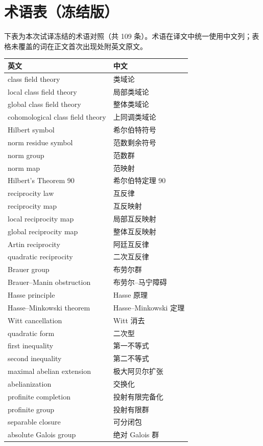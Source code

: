 \section*{术语表（冻结版）}
下表为本次试译冻结的术语对照（共 109 条）。术语在译文中统一使用中文列；表格未覆盖的词在正文首次出现处附英文原文。
\begin{longtable}{p{}p{}}
\toprule 英文 & 中文 \\ \midrule \endhead
class field theory & 类域论 \\
local class field theory & 局部类域论 \\
global class field theory & 整体类域论 \\
cohomological class field theory & 上同调类域论 \\
Hilbert symbol & 希尔伯特符号 \\
norm residue symbol & 范数剩余符号 \\
norm group & 范数群 \\
norm map & 范映射 \\
Hilbert's Theorem 90 & 希尔伯特定理 90 \\
reciprocity law & 互反律 \\
reciprocity map & 互反映射 \\
local reciprocity map & 局部互反映射 \\
global reciprocity map & 整体互反映射 \\
Artin reciprocity & 阿廷互反律 \\
quadratic reciprocity & 二次互反律 \\
Brauer group & 布劳尔群 \\
Brauer–Manin obstruction & 布劳尔–马宁障碍 \\
Hasse principle & Hasse 原理 \\
Hasse–Minkowski theorem & Hasse–Minkowski 定理 \\
Witt cancellation & Witt 消去 \\
quadratic form & 二次型 \\
first inequality & 第一不等式 \\
second inequality & 第二不等式 \\
maximal abelian extension & 极大阿贝尔扩张 \\
abelianization & 交换化 \\
profinite completion & 投射有限完备化 \\
profinite group & 投射有限群 \\
separable closure & 可分闭包 \\
absolute Galois group & 绝对 Galois 群 \\

\end{longtable}

